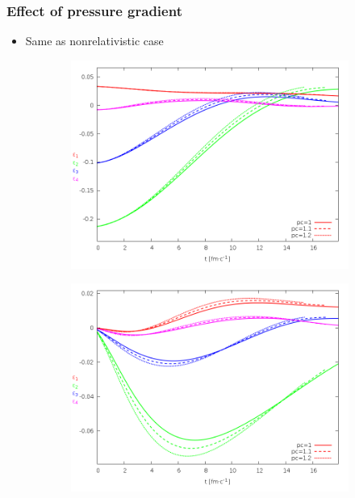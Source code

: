 \documentclass{beamer}
\begin{document}
\begin{frame}
\frametitle{Effect of pressure gradient}
\begin{center}
\begin{itemize}
\item Same as nonrelativistic case
\end{itemize}
\begin{figure}[H]
	\centering
    \begin{subfigure}[b]{0.49\textwidth}
    		\includegraphics[width=\textwidth]{pic/res/rel/eps_pc_n}
	\end{subfigure}
	\begin{subfigure}[b]{0.49\textwidth}
        	\includegraphics[width=\textwidth]{pic/res/rel/eps_pc_v}
	\end{subfigure}
\end{figure}
\end{center}
\end{frame}
\end{document}
